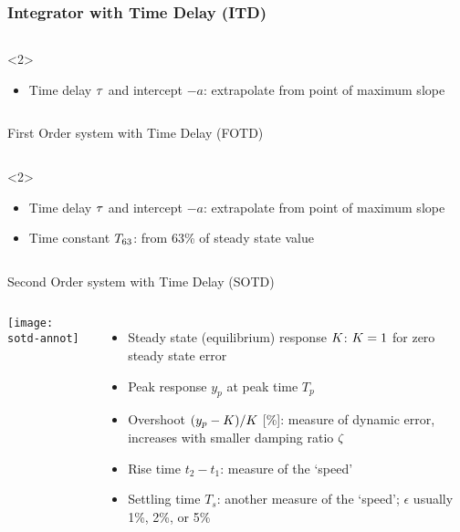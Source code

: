 \documentclass{beamer-control}
\begin{document}
\begin{frame}
\frametitle{Integrator with Time Delay (ITD)}
\begin{columns}
%
%

\scriptsize
\begin{uncoverenv}<2>
\begin{itemize}
\item Time delay $\tau$ and intercept $-a$: extrapolate from point of maximum slope
\end{itemize}
\end{uncoverenv}
\end{columns}
\end{frame}

\begin{frame}{First Order system with Time Delay (FOTD)}
\begin{columns}
%
%

\scriptsize
\begin{uncoverenv}<2>
\begin{itemize}
\item Time delay $\tau$ and intercept $-a$: extrapolate from point of maximum slope
\item Time constant $T_{63}$: from 63\% of steady state value
\end{itemize}
\end{uncoverenv}
\end{columns}
\end{frame}


\begin{frame}{Second Order system with Time Delay (SOTD)}
\begin{columns}
\texttt{[image: sotd-annot]}

\scriptsize
\begin{itemize}
\item Steady state (equilibrium) response $K$: $K=1$ for zero steady state error
\item Peak response $y_p$ at peak time $T_p$
\item Overshoot $(y_p-K)/K$ [\%]: measure of dynamic error, increases with smaller damping ratio $\zeta$
\item Rise time $t_2-t_1$: measure of the `speed'
\item Settling time $T_s$: another measure of the `speed'; $\epsilon$ usually 1\%, 2\%, or 5\%
\end{itemize}
\end{columns}
\end{frame}
\end{document}
